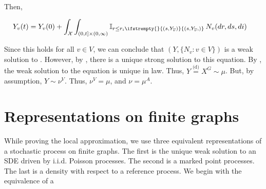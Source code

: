 \documentclass[12pt]{article}
\newcommand{\mb}{\mathbb}
\newcommand{\mc}{\mathcal}
\newcommand{\ov}{\overline}
\newcommand{\deq}{\overset{\text{(d)}}{=}}			%
\newcommand{\sta}{\mc{X}}							%
\newcommand{\cl}[1]{\ov{#1}}						%
\newcommand{\Xf}{X}									%
\newcommand{\poiss}{N}								%
\newcommand{\rate}{r}								%
\newcommand{\m}{\mu}								%
\newcommand{\poissv}[1]{_{#1}}						%
\newcommand{\vind}[1]{_{#1}}						%
\newcommand{\tme}[1]{(#1)}							%
\newcommand{\gind}[1]{^{#1}}						%
\newcommand{\vpara}[1]{^{#1}}						%
\newcommand{\stpara}[1]{_{#1}}						%
\newcommand{\tmepro}[3]{
\ifstrempty{#3}{
	\left(#1,#2\right)}{
	\left(#1,#2,#3\right)}}							%
\newcommand{\Xg}{Y}									%
\newcommand{\mm}{\nu}								%
\begin{document}
Then,

\begin{align*}
\Xg\vind{v}\tme{t} &= \Xg\vind{v}\tme{0} + \int_\sta\int_{(0,t]\times(0,\infty)} \mb{I}_{r \leq \rate\stpara{i}\tmepro{s}{\Xg\vind{\cl{v}}}{}}\,\poiss\poissv{v}(dr,ds,di)
\end{align*}

Since this holds for all \(v \in V\), we can conclude that \((\Xg,\{\poiss\poissv{v}:v \in V\})\) is a weak solution to \cite[equation \eqref{F-p::Xf}]{F}. However, by \cite[theorem \ref{F-wp::wp}]{F}, there is a unique strong solution to this equation. By \cite[proposition 2.10]{Kur07}, the weak solution to the equation is unique in law. Thus, \(\Xg \deq \Xf\gind{G} \sim \m\). But, by assumption, \(\Xg\sim \mm\vpara{V}\). Thus, \(\mm\vpara{V} = \m\), and \(\mm = \m\vpara{A}\).


\newpage

\appendix
\section{Representations on finite graphs}
\label{ref}

While proving the local approximation, we use three equivalent representations of a stochastic process on finite graphs. The first is the unique weak solution to an SDE driven by i.i.d. Poisson processes. The second is a marked point processes. The last is a density with respect to a reference process. We begin with the equivalence of a
\end{document}
